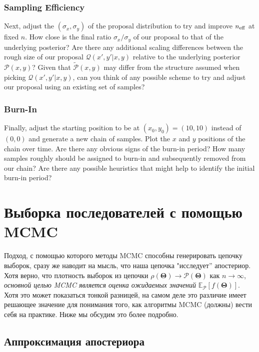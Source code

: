 \documentclass[12pt, titlepage]{article}
\newcommand{\meanwrt}[2]{\ensuremath{\mathbb{E}_{{#2}}\left[{#1}\right]}}
\newcommand{\params}{\ensuremath{\boldsymbol\Theta}}
\newcommand{\posterior}{\ensuremath{\mathcal{P}}}
\newcommand{\proposal}{\ensuremath{\mathcal{Q}}}
\begin{document}
\subsubsection*{Sampling Efficiency}

Next, adjust the $(\sigma_x, \sigma_y)$ of the proposal distribution
to try and improve $n_{\rm eff}$ at fixed $n$. How close is the final
ratio $\sigma_x/\sigma_y$ of our proposal to that of the underlying
posterior? Are there any additional scaling differences between the rough
size of our proposal $\proposal(x',y'|x,y)$ relative to the
underlying posterior $\posterior(x,y)$?
Given that $\tilde{\posterior}(x,y)$ may differ from the
structure assumed when picking $\proposal(x',y'|x,y)$,
can you think of any possible scheme to try and adjust our proposal
using an existing set of samples?

\subsubsection*{Burn-In}

Finally, adjust the starting position to be at
$(x_0,y_0)=(10,10)$ instead of $(0,0)$ and generate a new chain of 
samples. Plot the $x$ and $y$ positions of the chain over time.
Are there any obvious signs of the burn-in period? How many samples
roughly should be assigned to burn-in and subsequently removed from
our chain? Are there any possible heuristics that might help to identify
the initial burn-in period?

\section{Выборка последователей с помощью MCMC} \label{sec:sampling}

Подход, с помощью которого методы MCMC способны генерировать цепочку выборок, сразу же наводит на мысль, что наша цепочка "исследует'' апостериор. Хотя верно, что плотность выборок из цепочки $\rho(\params)\rightarrow \posterior(\params)$ как $n \rightarrow \infty$, \textit{основной целью MCMC является оценка ожидаемых значений} $\meanwrt{f(\params)}{\posterior}$. Хотя это может показаться тонкой разницей, на самом деле это различие имеет решающее значение для понимания того, как алгоритмы MCMC (должны) вести себя на практике. Ниже мы обсудим это более подробно.

\subsection{Аппроксимация апостериора} \label{subsec:post_approx}
\end{document}
